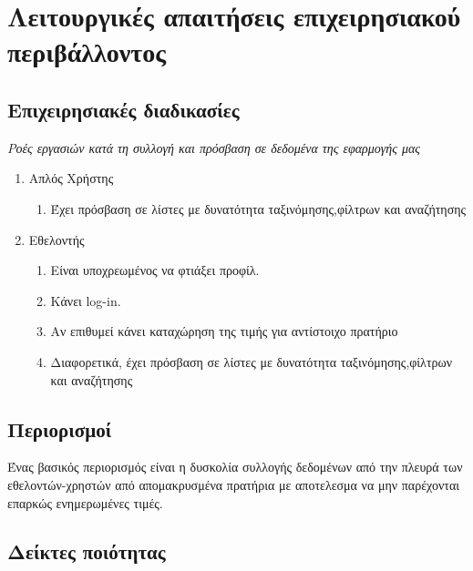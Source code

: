 \section{Λειτουργικές απαιτήσεις επιχειρησιακού περιβάλλοντος}



\subsection{Επιχειρησιακές διαδικασίες}
\textit{Ροές εργασιών κατά τη συλλογή και πρόσβαση σε δεδομένα της εφαρμογής μας}

\begin{enumerate}
	\item Απλός Χρήστης
	\begin{enumerate}
		\item Έχει πρόσβαση σε λίστες με δυνατότητα ταξινόμησης,φίλτρων και αναζήτησης 
	\end{enumerate}
	\item Εθελοντής 
	\begin{enumerate}
		\item Είναι υποχρεωμένος να φτιάξει προφίλ.
		\item Κάνει log-in.
		\item Αν επιθυμεί κάνει καταχώρηση της τιμής για αντίστοιχο πρατήριο
		\item Διαφορετικά, έχει πρόσβαση σε λίστες με δυνατότητα ταξινόμησης,φίλτρων και αναζήτησης 
	\end{enumerate}
	
\end{enumerate}

\subsection{Περιορισμοί}
Ένας βασικός περιορισμός είναι η δυσκολία συλλογής δεδομένων από την πλευρά των εθελοντών-χρηστών από απομακρυσμένα πρατήρια με αποτελεσμα να μην παρέχονται επαρκώς ενημερωμένες τιμές. 


\subsection{Δείκτες ποιότητας}

